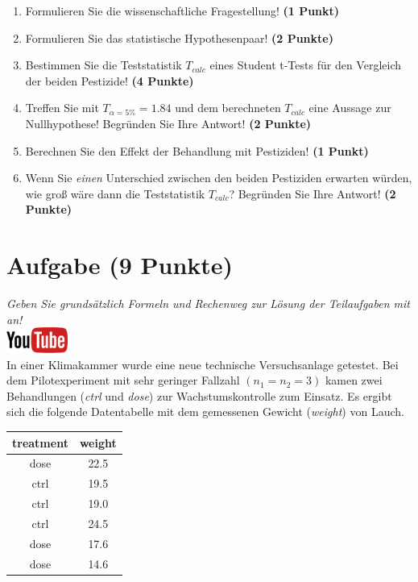\documentclass[a4paper, 9pt]{scrartcl}\usepackage[]{graphicx}\usepackage[]{xcolor}
\begin{document}
\begin{enumerate}
  \item Formulieren Sie die wissenschaftliche Fragestellung! \textbf{(1 Punkt)}
  \item Formulieren Sie das statistische Hypothesenpaar! \textbf{(2
      Punkte)}
  \item Bestimmen Sie die Teststatistik $T_{calc}$ eines Student t-Tests f{\"u}r den
  Vergleich der beiden Pestizide! \textbf{(4 Punkte)}
\item Treffen Sie mit $T_{\alpha = 5\%} = 1.84$ und dem berechneten $T_{calc}$ eine Aussage
  zur Nullhypothese! Begr{\"u}nden Sie Ihre Antwort! \textbf{(2 Punkte)}
\item Berechnen Sie den Effekt der Behandlung mit Pestiziden! \textbf{(1 Punkt)}
\item Wenn Sie \textit{einen} Unterschied zwischen den beiden
  Pestiziden erwarten w{\"u}rden, wie gro{\ss} w{\"a}re dann die Teststatistik
  $T_{calc}$? Begr{\"u}nden Sie Ihre Antwort! \textbf{(2 Punkte)}
\end{enumerate} 
\clearpage

\section{Aufgabe \hfill (9 Punkte)}

\textit{Geben Sie grunds{\"a}tzlich Formeln und Rechenweg zur L{\"o}sung der
  Teilaufgaben mit an!} \\[1Ex]

\hfill\href{https://youtu.be/eejS2uG4o-M}{\includegraphics[width =
  2cm]{img/youtube}}\\[1Ex]



In einer Klimakammer wurde eine neue technische Versuchsanlage getestet. Bei dem
Pilotexperiment mit sehr geringer Fallzahl $(n_1 = n_2 = 3)$ kamen zwei
Behandlungen (\textit{ctrl} und \textit{dose}) zur Wachstumskontrolle zum
Einsatz. Es ergibt sich die folgende Datentabelle mit dem gemessenen
Gewicht (\textit{weight}) von Lauch.

\begin{table}[!h]
\centering
\begin{tabular}{cc}
\toprule
treatment & weight\\
\midrule
dose & 22.5\\
ctrl & 19.5\\
ctrl & 19.0\\
ctrl & 24.5\\
dose & 17.6\\
\addlinespace
dose & 14.6\\
\bottomrule
\end{tabular}
\end{table}
\end{document}
